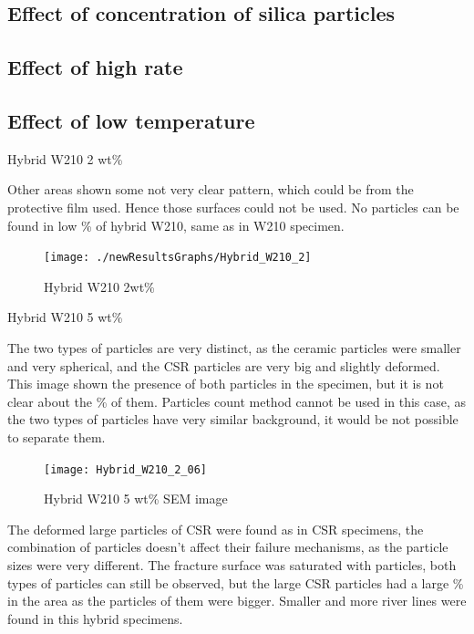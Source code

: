 \documentclass[numbers=noendperiod,chapterprefix=on]{icldt} %
\begin{document}
\subsection{Effect of concentration of silica particles}

\subsection{Effect of high rate}

\subsection{Effect of low temperature}

Hybrid W210 2 wt\%

Other areas shown some not very clear pattern, which could be from the protective film used. Hence those surfaces could not be used. No particles can be found in low \% of hybrid W210, same as in W210 specimen. 

\begin{figure}[!hp]
\centering
\texttt{[image: ./newResultsGraphs/Hybrid\_W210\_2]}
\caption{Hybrid W210 2wt\%} \label{Hybrid_W210_2}
\end{figure}
\FloatBarrier

Hybrid W210 5 wt\%

The two types of particles are very distinct, as the ceramic particles were smaller and very spherical, and the CSR particles are very big and slightly deformed. This image shown the presence of both particles in the specimen, but it is not clear about the \% of them. Particles count method cannot be used in this case, as the two types of particles have very similar background, it would be not possible to separate them.

\begin{figure}[!hp]
\centering
\texttt{[image: Hybrid\_W210\_2\_06]}
\caption{Hybrid W210 5 wt\% SEM image} \label{Hybrid_W210_2_06}
\end{figure}
\FloatBarrier

The deformed large particles of CSR were found as in CSR specimens, the combination of particles doesn’t affect their failure mechanisms, as the particle sizes were very different. The fracture surface was saturated with particles, both types of particles can still be observed, but the large CSR particles had a large \% in the area as the particles of them were bigger.
Smaller and more river lines were found in this hybrid specimens.    
\end{document}

